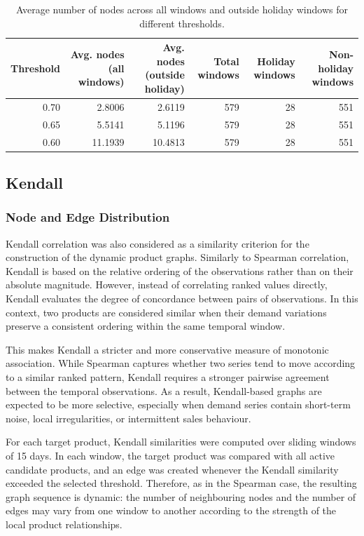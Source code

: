 \begin{table}[ht]
\centering
\begin{tabular}{rrrrrr}
\hline
Threshold & Avg. nodes (all windows) & Avg. nodes (outside holiday) & Total windows & Holiday windows & Non-holiday windows \\
\hline
0.70 & 2.8006  & 2.6119  & 579 & 28 & 551 \\
0.65 & 5.5141  & 5.1196  & 579 & 28 & 551 \\
0.60 & 11.1939 & 10.4813 & 579 & 28 & 551 \\
\hline
\end{tabular}
\caption{Average number of nodes across all windows and outside holiday windows for different thresholds.}
\label{tab:avg_nodes_thresholds}
\end{table}

\subsection{Kendall}
\label{subsec:kendall_graphs}

\subsubsection{Node and Edge Distribution}
\label{subsubsec:kendall_node_edge_distribution}

Kendall correlation was also considered as a similarity criterion for the construction of the dynamic product graphs. Similarly to Spearman correlation, Kendall is based on the relative ordering of the observations rather than on their absolute magnitude. However, instead of correlating ranked values directly, Kendall evaluates the degree of concordance between pairs of observations. In this context, two products are considered similar when their demand variations preserve a consistent ordering within the same temporal window.

This makes Kendall a stricter and more conservative measure of monotonic association. While Spearman captures whether two series tend to move according to a similar ranked pattern, Kendall requires a stronger pairwise agreement between the temporal observations. As a result, Kendall-based graphs are expected to be more selective, especially when demand series contain short-term noise, local irregularities, or intermittent sales behaviour.

For each target product, Kendall similarities were computed over sliding windows of 15 days. In each window, the target product was compared with all active candidate products, and an edge was created whenever the Kendall similarity exceeded the selected threshold. Therefore, as in the Spearman case, the resulting graph sequence is dynamic: the number of neighbouring nodes and the number of edges may vary from one window to another according to the strength of the local product relationships.

